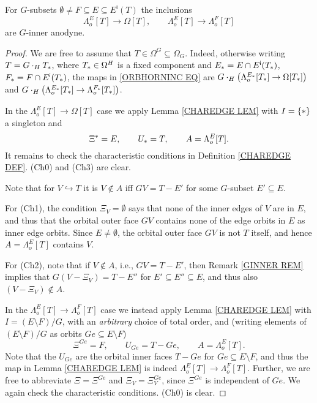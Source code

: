 \documentclass[a4paper,10pt
,draft
]{article}%
\begin{document}
\begin{proposition}\label{ORB_HORN_PROP}
	For $G$-subsets  
	$\emptyset \neq F \subseteq E \subseteq E^{\mathsf{i}}(T)$
	the inclusions
\begin{equation}\label{ORBHORNINC EQ}
	\Lambda_o^{E}[T] \to \Omega[T],\qquad
	\Lambda_o^{E}[T] \to \Lambda_o^{F}[T]
\end{equation}
	are $G$-inner anodyne.
\end{proposition}


\begin{proof}
We are free to assume that $T \in \Omega^G \subseteq \Omega_G$. Indeed, otherwise writing $T = G \cdot_H T_{\**}$, where $T_{\**} \in \Omega^H$ is a fixed component and 
$E_{\**}=E \cap E^{\mathsf{i}}(T_{\**})$, $F_{\**} = F \cap E^{\mathsf{i}}(T_{\**})$,
the maps in \eqref{ORBHORNINC EQ} are
$G \cdot_H 
\left( \Lambda_o^{E_{\**}}[T_{\**}] \to \Omega[T_{\**}]\right)$
and
$G \cdot_H 
\left( \Lambda_o^{E_{\**}}[T_{\**}] \to \Lambda_o^{F_{\**}}[T_{\**}]\right)$.

In the $\Lambda_o^{E}[T] \to \Omega[T]$ case we apply
Lemma \ref{CHAREDGE LEM} with $I = \{\**\}$ a singleton and
\[
	\Xi^{\**} = E, \qquad 
	U_{\**} = T,\qquad
	A=\Lambda_o^{E}[T].
\]
It remains to check the characteristic conditions in Definition \ref{CHAREDGE DEF}.
	(Ch0) and (Ch3) are clear.

Note that for $V\hookrightarrow T$ it is $V \not \in A$ iff 
$GV = T-E'$ for some $G$-subset
$E' \subseteq E$.

For (Ch1), the condition $\Xi_{V} = \emptyset$
says that none of the inner edges of $V$ are in $E$,
and thus that the orbital outer face $G V$ contains none of the edge orbits in $E$ as inner edge orbits. Since $E \neq \emptyset$, the orbital outer face $GV$ is not $T$ itself, 
and hence $A=\Lambda_o^{E}[T]$ contains $V$.

For (Ch2), note that if $V \not \in A$, i.e., 
$GV = T - E'$, then Remark \ref{GINNER REM} implies that
$G(V-\Xi_V) = T - E''$ for $E'\subseteq E'' \subseteq E$,
and thus also $(V-\Xi_V) \not \in A$.


In the $\Lambda_o^{E}[T] \to \Lambda_o^{F}[T]$ case 
we instead apply Lemma \ref{CHAREDGE LEM} with $I = (E \setminus F)/G$, with an 
\textit{arbitrary} choice of total order, and 
(writing elements of $(E \setminus F)/G$ as orbits $Ge \subseteq E \setminus F$)
\[
	\Xi^{Ge} = F, \qquad 
	U_{G e}= T - Ge, \qquad
	A=\Lambda_o^{E}[T].
\]
Note that the $U_{Ge}$ are the orbital inner faces $T - Ge$ for $Ge \subseteq E \setminus F$, and thus the map
in Lemma \ref{CHAREDGE LEM} is indeed $\Lambda_o^{E}[T] \to \Lambda_o^{F}[T]$.
Further, we are free to abbreviate $\Xi = \Xi^{Ge}$ and $\Xi_V = \Xi^{Ge}_V$, since
$\Xi^{Ge}$ is independent of $G e$.
We again check the characteristic conditions. (Ch0) is clear.


\end{proof}
\end{document}
